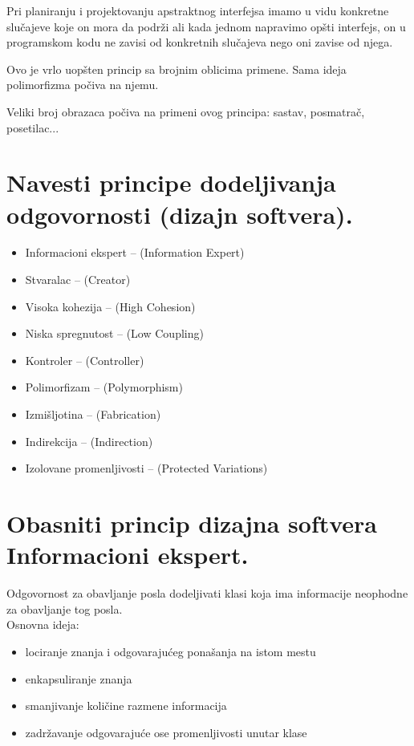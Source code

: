 \documentclass[a4paper]{article}
\begin{document}
Pri planiranju i projektovanju apstraktnog interfejsa imamo u vidu konkretne slučajeve koje on mora da podrži ali kada jednom napravimo opšti interfejs, on u programskom kodu ne zavisi od konkretnih slučajeva nego oni zavise od njega.

Ovo je vrlo uopšten princip sa brojnim oblicima primene. Sama ideja polimorfizma počiva na njemu.

Veliki broj obrazaca počiva na primeni ovog principa: sastav, posmatrač, posetilac...

\section{Navesti principe dodeljivanja odgovornosti (dizajn softvera).}
\begin{itemize}
  \item Informacioni ekspert – (Information Expert)
  \item Stvaralac – (Creator)
  \item Visoka kohezija – (High Cohesion)
  \item Niska spregnutost – (Low Coupling)
  \item Kontroler – (Controller)
  \item Polimorfizam – (Polymorphism)
  \item Izmišljotina – (Fabrication)
  \item Indirekcija – (Indirection)
  \item Izolovane promenljivosti – (Protected Variations)
\end{itemize}

\section{Obasniti princip dizajna softvera Informacioni ekspert.}
Odgovornost za obavljanje posla dodeljivati klasi koja ima informacije neophodne za obavljanje tog posla.\\

Osnovna ideja:
\begin{itemize}
   \item lociranje znanja i odgovarajućeg ponašanja na istom mestu
   \item enkapsuliranje znanja
   \item smanjivanje količine razmene informacija
   \item zadržavanje odgovarajuće ose promenljivosti unutar klase\\
\end{itemize}
   
\end{document}
